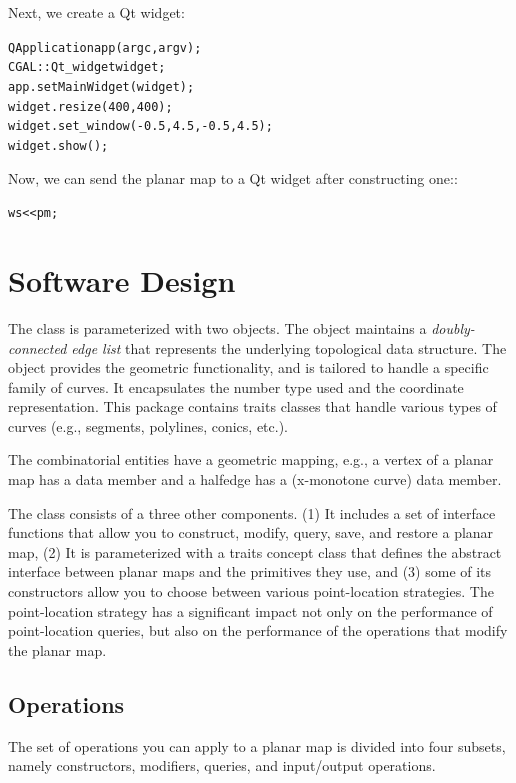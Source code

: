 Next, we create a Qt widget:

\begin{alltt}
  QApplication app(argc, argv);
  CGAL::Qt_widget widget;
  app.setMainWidget(widget);
  widget.resize(400,400);
  widget.set_window(-0.5, 4.5, -0.5, 4.5);
  widget.show();
\end{alltt}

Now, we can send the planar map to a Qt widget after constructing
one::

\begin{alltt}
  ws << pm;
\end{alltt}

\section{Software Design}
The  class is parameterized with two
objects. The  object maintains a {\em doubly-connected edge list}
that represents the underlying topological data structure. The
 object provides the geometric functionality, and is
tailored to handle a specific family of curves. It encapsulates the
number type used and the coordinate representation. This package
contains traits classes that handle various types of curves (e.g.,
segments, polylines, conics, etc.).

The combinatorial entities have a geometric mapping, e.g.,
a vertex of a planar map has a  data member and a halfedge
has a  (x-monotone curve) data member.

The  class consists of a three other
components. (1) It includes a set of interface functions that allow
you to construct, modify, query, save, and restore a planar map,
(2) It is parameterized with a traits concept class that defines the
abstract interface between planar maps and the primitives they use,
and (3) some of its constructors allow you to choose between
various point-location strategies. The point-location strategy has a
significant impact not only on the performance of point-location
queries, but also on the performance of the operations that modify the
planar map.

\subsection{Operations}
The set of operations you can apply to a planar map is divided into
four subsets, namely constructors, modifiers, queries, and
input/output operations. 

